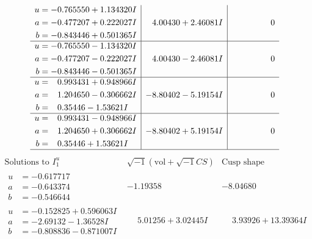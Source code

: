 \documentclass[1p]{elsarticle_modified}
\theoremstyle{definition}
\newcommand{\I}{\sqrt{-1}}
\begin{document}
$$\begin{array}{c|c|c}
\begin{aligned}
u &= -0.765550 + 1.134320 I \\
a &= -0.477207 + 0.222027 I \\
b &= -0.843446 + 0.501365 I\end{aligned}
 & \phantom{-}4.00430 + 2.46081 I & \phantom{-0.000000 } 0 \\ \hline\begin{aligned}
u &= -0.765550 - 1.134320 I \\
a &= -0.477207 - 0.222027 I \\
b &= -0.843446 - 0.501365 I\end{aligned}
 & \phantom{-}4.00430 - 2.46081 I & \phantom{-0.000000 } 0 \\ \hline\begin{aligned}
u &= \phantom{-}0.993431 + 0.948966 I \\
a &= \phantom{-}1.204650 - 0.306662 I \\
b &= \phantom{-}0.35446 - 1.53621 I\end{aligned}
 & -8.80402 - 5.19154 I & \phantom{-0.000000 } 0 \\ \hline\begin{aligned}
u &= \phantom{-}0.993431 - 0.948966 I \\
a &= \phantom{-}1.204650 + 0.306662 I \\
b &= \phantom{-}0.35446 + 1.53621 I\end{aligned}
 & -8.80402 + 5.19154 I & \phantom{-0.000000 } 0\\
 \hline 
 \end{array}$$\newpage$$\begin{array}{c|c|c}  
\text{Solutions to }I^u_{1}& \I (\text{vol} + \sqrt{-1}CS) & \text{Cusp shape}\\
 \hline 
\begin{aligned}
u &= -0.617717\phantom{ +0.000000I} \\
a &= -0.643374\phantom{ +0.000000I} \\
b &= -0.546644\phantom{ +0.000000I}\end{aligned}
 & -1.19358\phantom{ +0.000000I} & -8.04680\phantom{ +0.000000I} \\ \hline\begin{aligned}
u &= -0.152825 + 0.596063 I \\
a &= -2.69132 - 1.36528 I \\
b &= -0.808836 - 0.871007 I\end{aligned}
 & \phantom{-}5.01256 + 3.02445 I & \phantom{-}3.93926 + 13.39364 I \\ \hline\begin{aligned}

\end{aligned}
\end{array}$$
\end{document}
